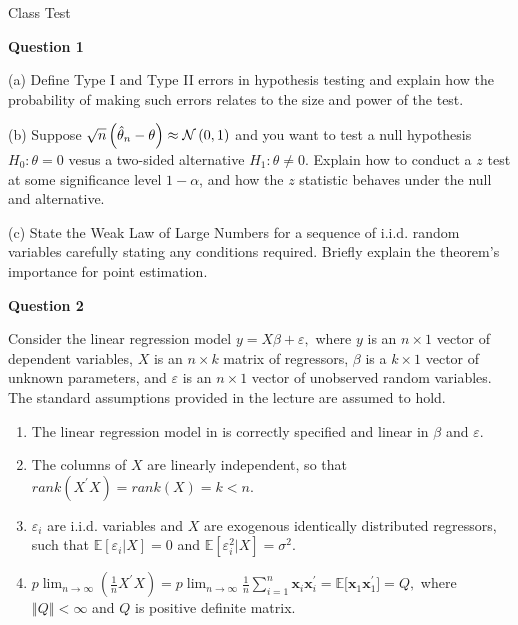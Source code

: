 \documentclass{article}
\begin{document}
\begin{center}
{\Large Class Test}
\end{center}

\textbf{Question 1}

(a) Define Type I and Type II errors in hypothesis testing and explain how
the probability of making such errors relates to the size and power of the
test.

(b) Suppose $\sqrt{n}\left( \hat{\theta}_{n}-\theta \right) \approx \mathcal{%
N}\left( 0,1\right) $ and you want to test a null hypothesis $H_{0}:\theta =0
$ vesus a two-sided alternative $H_{1}:\theta \neq 0.$ Explain how to
conduct a $z$ test at some significance level $1-\alpha $, and how the $z$
statistic behaves under the null and alternative.

(c) State the Weak Law of Large Numbers for a sequence of i.i.d. random
variables carefully stating any conditions required. Briefly explain the
theorem's importance for point estimation. 

\bigskip

\textbf{Question 2}

Consider the linear regression model $y=X\beta +\varepsilon ,$ where $y$ is
an $n\times 1$ vector of dependent variables, $X$ is an $n\times k$ matrix
of regressors, $\beta $ is a $k\times 1$ vector of unknown parameters, and $%
\varepsilon $ is an $n\times 1$ vector of unobserved random variables. The
standard assumptions provided in the lecture are assumed to hold.

\begin{enumerate}
\item The linear regression model in is correctly specified and linear in $%
\beta $ and $\varepsilon .$

\item The columns of $X$ are linearly independent, so that $rank(X^{\prime
}X)=rank(X)=k<n.$

\item $\varepsilon _{i}$ are i.i.d. variables and $X$ are exogenous
identically distributed regressors, such that $\mathbb{E}[\varepsilon
_{i}|X]=0$ and $\mathbb{E}[\varepsilon _{i}^{2}|X]=\sigma ^{2}.$

\item $p\lim_{n\rightarrow \infty }(\frac{1}{n}X^{\prime
}X)=p\lim_{n\rightarrow \infty }\frac{1}{n}\sum_{i=1}^{n}\mathbf{x}_{i}%
\mathbf{x}_{i}^{\prime }=\mathbb{E[}\mathbf{x}_{1}\mathbf{x}_{1}^{\prime
}]=Q,$ where $\left\Vert Q\right\Vert <\infty $ and $Q$ is positive definite
matrix.
\end{enumerate}
\end{document}
